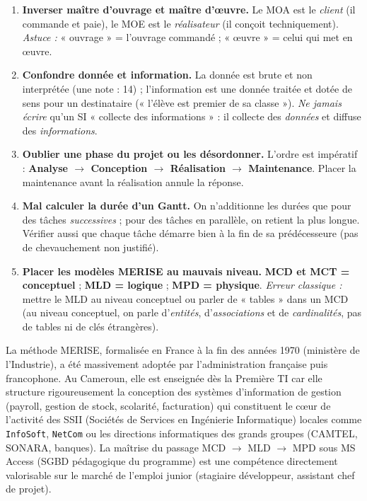 \documentclass[11pt]{article}
\newcommand{\cle}[1]{{\popxbold\color{popdark}#1}}
\begin{document}
\begin{attention}
\begin{enumerate}
\item \textbf{Inverser maître d'ouvrage et maître d'œuvre.}
      Le MOA est le \emph{client} (il commande et paie), le MOE est le \emph{réalisateur} (il conçoit techniquement).
      \textit{Astuce :} « ouvrage » = l'ouvrage commandé ; « œuvre » = celui qui met en œuvre.
\item \textbf{Confondre donnée et information.}
      La \cle{donnée} est brute et non interprétée (une note : 14) ; l'\cle{information} est une donnée traitée et dotée de sens pour un destinataire (« l'élève est premier de sa classe »).
      \textit{Ne jamais écrire} qu'un SI « collecte des informations » : il collecte des \emph{données} et diffuse des \emph{informations}.
\item \textbf{Oublier une phase du projet ou les désordonner.}
      L'ordre est impératif : \textbf{Analyse $\rightarrow$ Conception $\rightarrow$ Réalisation $\rightarrow$ Maintenance}.
      Placer la maintenance avant la réalisation annule la réponse.
\item \textbf{Mal calculer la durée d'un Gantt.}
      On n'additionne les durées que pour des tâches \emph{successives} ; pour des tâches en parallèle, on retient la plus longue.
      Vérifier aussi que chaque tâche démarre bien à la fin de sa prédécesseure (pas de chevauchement non justifié).
\item \textbf{Placer les modèles MERISE au mauvais niveau.}
      \textbf{MCD et MCT = conceptuel} ; \textbf{MLD = logique} ; \textbf{MPD = physique}.
      \textit{Erreur classique :} mettre le MLD au niveau conceptuel ou parler de « tables » dans un MCD (au niveau conceptuel, on parle d'\emph{entités}, d'\emph{associations} et de \emph{cardinalités}, pas de tables ni de clés étrangères).
\end{enumerate}
\end{attention}

\begin{savaistu}
La méthode MERISE, formalisée en France à la fin des années 1970 (ministère de l'Industrie), a été massivement adoptée par l'administration française puis francophone. Au Cameroun, elle est enseignée dès la Première TI car elle structure rigoureusement la conception des systèmes d'information de gestion (payroll, gestion de stock, scolarité, facturation) qui constituent le cœur de l'activité des SSII (Sociétés de Services en Ingénierie Informatique) locales comme \texttt{InfoSoft}, \texttt{NetCom} ou les directions informatiques des grands groupes (CAMTEL, SONARA, banques). La maîtrise du passage MCD $\rightarrow$ MLD $\rightarrow$ MPD sous MS Access (SGBD pédagogique du programme) est une compétence directement valorisable sur le marché de l'emploi junior (stagiaire développeur, assistant chef de projet).
\end{savaistu}
\end{document}

